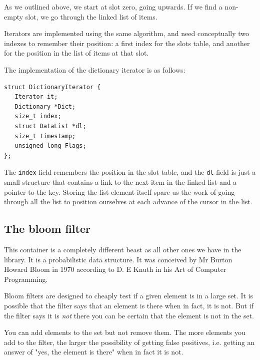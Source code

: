 \documentclass[12pt,a4paper]{memoir} %
\newcommand{\container}{}
\begin{document}
{{As we outlined above, we start at slot zero, going upwards. If we find a non-empty slot, we go through the linked list of items.

Iterators are implemented using the same algorithm, and need conceptually two indexes to remember their position: a first index for the slots table, 
and another for the position in the list of items at that slot.

The implementation of the dictionary iterator is as follows:
\begin{verbatim}
struct DictionaryIterator {
   Iterator it;
   Dictionary *Dict;
   size_t index;
   struct DataList *dl;
   size_t timestamp;
   unsigned long Flags;
};
\end{verbatim}
The \texttt{index} field remembers the position in the slot table, and the \texttt{dl} field is just a small structure that contains a link to the 
next item in the linked list and a pointer to the key. Storing the list element itself spare us the work of going through all the list to position ourselves at each advance of the cursor in the list.
\subsection{The bloom filter}
\renewcommand{\container}{bloom filter}
This container is a completely different beast as all other ones we have in the library. It is a probabilistic data structure. It was conceived by
Mr Burton Howard Bloom in 1970 according to D. E Knuth in his Art of Computer Programming.

Bloom filters are designed to cheaply test if a given element is in a large set. It is possible that the filter says that an element is there
when in fact, it is not. But if the filter says it is \textsl{not} there you can be certain that the element is not in the set.

You can add elements to the set but not remove them. The more elements you add to the filter, the larger the possibility of getting false positives, i.e.
getting an answer of "yes, the element is there" when in fact it is not.


}}
\end{document}
